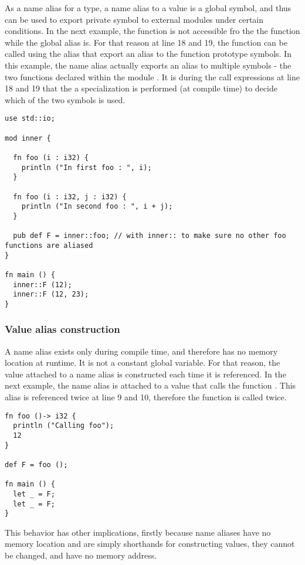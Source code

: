 As a name alias for a type, a name alias to a value is a global symbol, and thus
can be used to export private symbol to external modules under certain
conditions. In the next example, the function  is not accessible fro
the the  function while the global alias  is. For that
reason at line 18 and 19, the function  can be called using the alias
 that export an alias to the function prototype symbols. In this
example, the name alias actually exports an alias to multiple symbols - the two
functions  declared within the module . It is during the
call expressions at line 18 and 19 that the a specialization is performed (at
compile time) to decide which of the two symbols is used.

\begin{lstlisting}[style=coloredverbatim]
use std::io;

mod inner {

  fn foo (i : i32) {
    println ("In first foo : ", i);
  }

  fn foo (i : i32, j : i32) {
    println ("In second foo : ", i + j);
  }

  pub def F = inner::foo; // with inner:: to make sure no other foo functions are aliased
}

fn main () {
  inner::F (12);
  inner::F (12, 23);
}
\end{lstlisting}

\subsubsection*{Value alias construction}

A name alias exists only during compile time, and therefore has no memory
location at runtime. It is not a constant global variable. For that reason, the
value attached to a name alias is constructed each time it is referenced. In the
next example, the name alias  is attached to a value that calls the
function . This alias is referenced twice at line 9 and 10, therefore
the function  is called twice.

\begin{lstlisting}[style=coloredverbatim]
fn foo ()-> i32 {
  println ("Calling foo");
  12
}

def F = foo ();

fn main () {
  let _ = F;
  let _ = F;
}
\end{lstlisting}


This behavior has other implications, firstly because name aliases have no
memory location and are simply shorthands for constructing values, they cannot
be changed, and have no memory address.

